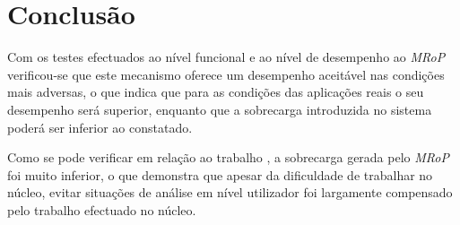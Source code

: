 \section{Conclusão}
\label{sec:five_chap_conclusion}

Com os testes efectuados ao nível funcional e ao nível de desempenho ao \textit{MRoP} verificou-se que este mecanismo oferece um desempenho aceitável nas condições mais adversas, o que indica que para as condições das aplicações reais o seu desempenho será superior, enquanto que a sobrecarga introduzida no sistema poderá ser inferior ao constatado.

Como se pode verificar em relação ao trabalho \cite{}, a sobrecarga gerada pelo \textit{MRoP} foi muito inferior, o que demonstra que apesar da dificuldade de trabalhar no núcleo, evitar situações de análise em nível utilizador foi largamente compensado pelo trabalho efectuado no núcleo.

